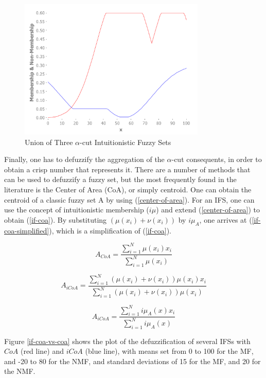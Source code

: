 \documentclass[conference]{IEEEtran}
\begin{document}
\begin{figure}[!t]
  \centering
  \includegraphics[width=3.5in]{ifs-union}
  \caption{Union of Three $\alpha$-cut Intuitionistic Fuzzy Sets}
  \label{ifs-union}
\end{figure}

Finally, one has to defuzzify the aggregation of the $\alpha$-cut 
consequents, in order to obtain a crisp number that represents
it. There are a number of methods that can be used to defuzzify a
fuzzy set, but the most frequently found in the literature is the
Center of Area (CoA), or simply centroid. One can obtain the centroid
of a classic fuzzy set A by using (\ref{center-of-area}). For an
IFS, one can use the concept of intuitionistic membership ($i\mu$) and
extend (\ref{center-of-area}) to obtain (\ref{if-coa}). By
substituting $(\mu(x_{i}) + \nu(x_{i}))$ by $i\mu_{A}$, one arrives at
(\ref{if-coa-simplified}), which is a simplification of (\ref{if-coa}).

\begin{equation}
  \label{center-of-area}
  A_{CoA} = \dfrac{\sum_{i=1}^{N} \mu(x_{i})
    x_{i}}{\sum_{i=1}^{N} \mu(x_{i})}
\end{equation}

\begin{equation}
  \label{if-coa}
  A_{iCoA} = \dfrac{\sum_{i=1}^{N} (\mu(x_{i}) + \nu(x_{i})) \mu(x_{i})
    x_{i}}{\sum_{i=1}^{N} (\mu(x_{i}) + \nu(x_{i})) \mu(x_{i})}
\end{equation}

\begin{equation}
  \label{if-coa-simplified}
  A_{iCoA} = \dfrac{\sum_{i=1}^{N} i\mu_{A}(x) x_{i}}{\sum_{i=1}^{N}
    i\mu_{A}(x)}
\end{equation}

Figure \ref{if-coa-vs-coa} shows the plot of the defuzzification of
several IFSs with $CoA$ (red line) and $iCoA$ (blue line), with means set
from 0 to 100 for the MF, and -20 to 80 for the NMF, and standard
deviations of 15 for the MF, and 20 for the NMF.
\end{document}
